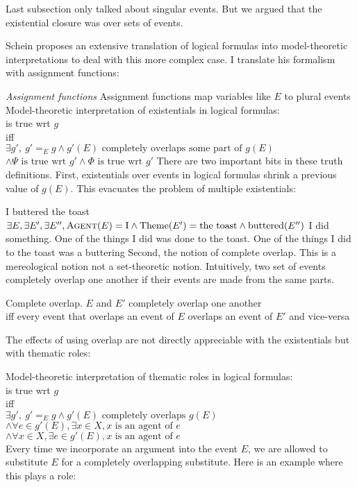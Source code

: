 Last subsection only talked about singular events. But we argued that the existential closure was over sets of events. 

Schein proposes an extensive translation of logical formulas into model-theoretic interpretations to deal with this more complex case. I translate his formalism with assignment functions:

\pex \emph{Assignment functions}
\a Assignment functions map variables like $E$ to plural events
\a Model-theoretic interpretation of existentials in logical formulas:\\[2pt]
 is true wrt $g$
 \\[2pt]iff\\[2pt]
$\exists g',\ g'=_E g\wedge g'(E)\text{ completely overlaps some part of }g(E)$\\
$\wedge \Psi\text{ is true wrt }g'\wedge\Phi\text{ is true wrt }g'$
\xe
%
There are two important bits in these truth definitions. First, existentials over events in logical formulas shrink a previous value of $g(E)$. This evacuates the problem of multiple existentials\footnotemark:

\pex
I buttered the toast
\a 
$\exists E,\exists E',\exists E'', \textsc{Agent}(E) = \text{I}\wedge\text{Theme}(E') = \text{the toast}\wedge\text{buttered}(E'') $
\a 
I did something. One of the things I did was done to the toast. One of the things I did to the toast was a buttering
\xe
%
Second, the notion of complete overlap. This is a mereological notion not a set-theoretic notion. Intuitively, two set of events completely overlap one another if their events are made from the same parts. 

\begin{boxy}{Complete overlap.} 
$E$ and $E'$ completely overlap one another \\
iff every event that overlaps an event of $E$ overlaps an event of $E'$ and vice-versa
\end{boxy}
%
The effects of using overlap are not directly appreciable with the existentials but with thematic roles:

\ex\label{theme_role}
Model-theoretic interpretation of thematic roles in logical formulas:\\[2pt]
 is true wrt $g$
 \\[2pt]iff\\[2pt]
$\exists g',\ g'=_E g\wedge g'(E)\text{ completely overlaps }g(E)$\\
$\wedge \forall e\in g'(E), \exists x\in X, x\text{ is an agent of }e$\\
$\wedge \forall x\in X, \exists e\in g'(E), x\text{ is an agent of }e$\\
\xe
%
Every time we incorporate an argument into the event $E$, we are allowed to substitute $E$ for a completely overlapping substitute. Here is an example where this plays a role:

